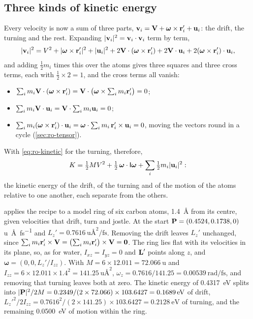 \subsection*{Three kinds of kinetic energy}

Every velocity is now a sum of three parts, $\bm{\mathrm{v}}_i = \bm{\mathrm{V}} +
\boldsymbol{\omega}\times\bm{\mathrm{r}}_i' + \bm{\mathrm{u}}_i$: the drift, the turning and
the rest. Expanding $\lvert\bm{\mathrm{v}}_i\rvert^2 = \bm{\mathrm{v}}_i\cdot\bm{\mathrm{v}}_i$ term
by term,
\begin{equation*}
   \lvert\bm{\mathrm{v}}_i\rvert^2 = V^2 + \lvert\boldsymbol{\omega}\times
   \bm{\mathrm{r}}_i'\rvert^2 + \lvert\bm{\mathrm{u}}_i\rvert^2
   + 2\bm{\mathrm{V}}\cdot(\boldsymbol{\omega}\times\bm{\mathrm{r}}_i') + 2\bm{\mathrm{V}}\cdot
   \bm{\mathrm{u}}_i + 2(\boldsymbol{\omega}\times\bm{\mathrm{r}}_i')\cdot\bm{\mathrm{u}}_i ,
\end{equation*}
and adding $\frac12 m_i$ times this over the atoms gives three squares and
three cross terms, each with $\frac12\times2 = 1$, and the cross terms all
vanish:
\begin{itemize}
\item $\sum_i m_i\bm{\mathrm{V}}\cdot(\boldsymbol{\omega}\times\bm{\mathrm{r}}_i') =
   \bm{\mathrm{V}}\cdot\bigl(\boldsymbol{\omega}\times\sum_i m_i\bm{\mathrm{r}}_i'\bigr) = 0$;
\item $\sum_i m_i\bm{\mathrm{V}}\cdot\bm{\mathrm{u}}_i = \bm{\mathrm{V}}\cdot\sum_i m_i\bm{\mathrm{u}}_i = 0$;
\item $\sum_i m_i(\boldsymbol{\omega}\times\bm{\mathrm{r}}_i')\cdot\bm{\mathrm{u}}_i =
   \boldsymbol{\omega}\cdot\sum_i m_i\,\bm{\mathrm{r}}_i'\times\bm{\mathrm{u}}_i = 0$, moving
   the vectors round in a cycle (\cref{sec:ro-tensor}).
\end{itemize}
With \cref{eq:ro-kinetic} for the turning, therefore,
\begin{equation}
   K = \tfrac12 MV^2 + \tfrac12\,\boldsymbol{\omega}\cdot\mathsf{I}
   \boldsymbol{\omega} + \sum_i\tfrac12 m_i\lvert\bm{\mathrm{u}}_i\rvert^2 :
   \label{eq:ro-split}
\end{equation}
the kinetic energy of the drift, of the turning and of the motion of the
atoms relative to one another, each separate from the others.

 applies the recipe to a model ring of six carbon
atoms, \SI{1.4}{\angstrom} from its centre, given velocities that drift,
turn and jostle. At the start $\bm{\mathrm{P}} = (0.4524, 0.1738, 0)$\,\si{\amu\angstrom\per
\femto\second} and $L_z' = \SI{0.7616}{\amu\angstrom\squared\per
\femto\second}$. Removing the drift leaves $L_z'$ unchanged, since
$\sum_i m_i\bm{\mathrm{r}}_i'\times\bm{\mathrm{V}} = \bigl(\sum_i m_i\bm{\mathrm{r}}_i'\bigr)\times
\bm{\mathrm{V}} = \bm{\mathrm{0}}$. The ring lies flat with its velocities in its plane, so,
as for water, $I_{xz} = I_{yz} = 0$ and $\bm{\mathrm{L}}'$ points along $z$, and
$\boldsymbol{\omega} = (0, 0, L_z'/I_{zz})$. With $M = 6\times12.011 =
\SI{72.066}{\amu}$ and $I_{zz} = 6\times12.011\times1.4^2 =
\SI{141.25}{\amu\angstrom\squared}$, $\omega_z = 0.7616/141.25 =
\SI{0.00539}{\radian\per\femto\second}$, and removing that turning leaves
both at zero. The kinetic energy of \SI{0.4317}{\electronvolt} splits into
$\lvert\bm{\mathrm{P}}\rvert^2/2M = 0.2349/(2\times72.066)\times103.6427 =
\SI{0.1689}{\electronvolt}$ of drift, $L_z'^2/2I_{zz} = 0.7616^2/(2\times
141.25)\times103.6427 = \SI{0.2128}{\electronvolt}$ of turning, and the
remaining \SI{0.0500}{\electronvolt} of motion within the ring.

